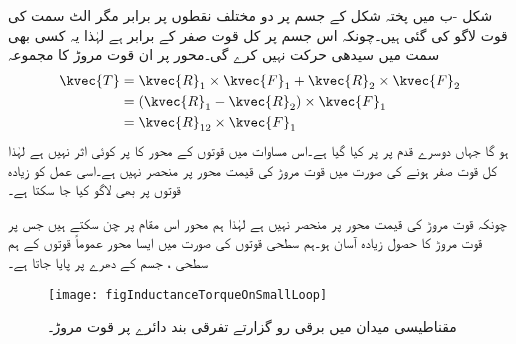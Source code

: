 شکل -ب میں  پختہ شکل کے جسم پر دو مختلف نقطوں پر برابر مگر الٹ سمت کی قوت لاگو کی گئی ہیں۔چونکہ اس جسم پر کل قوت صفر کے برابر ہے لہٰذا یہ کسی بھی سمت میں سیدھی حرکت نہیں کرے گی۔محور  پر ان قوت مروڑ کا مجموعہ
\begin{align*}
\kvec{T}&=\kvec{R}_1 \times \kvec{F}_1+\kvec{R}_2 \times \kvec{F}_2\\
&=(\kvec{R}_1-\kvec{R}_2) \times \kvec{F}_1\\
&=\kvec{R}_{12} \times \kvec{F}_1
\end{align*}
ہو گا جہاں دوسرے قدم پر   پر کیا گیا ہے۔اس مساوات میں قوتوں کے محور کا  پر کوئی اثر نہیں ہے لہٰذا کل قوت صفر ہونے کی صورت میں قوت مروڑ کی قیمت محور پر منحصر نہیں ہے۔اسی عمل کو زیادہ قوتوں پر بھی لاگو کیا جا سکتا ہے۔

چونکہ قوت مروڑ کی قیمت محور پر منحصر نہیں ہے لہٰذا ہم محور اس مقام پر چن سکتے ہیں جس پر قوت مروڑ کا حصول زیادہ آسان ہو۔ہم سطحی قوتوں کی صورت میں ایسا محور عموماً قوتوں کے ہم سطحی ، جسم  کے دھرے پر پایا جاتا ہے۔

\begin{figure}
\centering
\texttt{[image: figInductanceTorqueOnSmallLoop]}
\caption{مقناطیسی میدان میں برقی رو گزارتے تفرقی بند دائرے پر قوت مروڑ۔}
\label{شکل_امالہ-تفرقی_دائرے_پر_مروڑ}
\end{figure}

